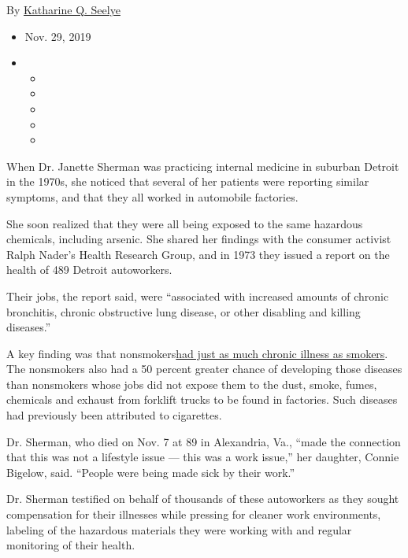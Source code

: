 By
\href{https://www.nytimes3xbfgragh.onion/by/katharine-q-seelye}{Katharine
Q. Seelye}

\begin{itemize}
\item
  Nov. 29, 2019
\item
  \begin{itemize}
  \item
  \item
  \item
  \item
  \item
  \end{itemize}
\end{itemize}

When Dr. Janette Sherman was practicing internal medicine in suburban
Detroit in the 1970s, she noticed that several of her patients were
reporting similar symptoms, and that they all worked in automobile
factories.

She soon realized that they were all being exposed to the same hazardous
chemicals, including arsenic. She shared her findings with the consumer
activist Ralph Nader's Health Research Group, and in 1973 they issued a
report on the health of 489 Detroit autoworkers.

Their jobs, the report said, were ``associated with increased amounts of
chronic bronchitis, chronic obstructive lung disease, or other disabling
and killing diseases.''

A key finding was that
nonsmokers\href{https://www.nytimes3xbfgragh.onion/1973/09/09/archives/heartlung-ills-tied-to-job-perils-study-challenges-ideas-on-the.html?searchResultPosition=2}{had
just as much chronic illness as smokers}. The nonsmokers also had a 50
percent greater chance of developing those diseases than nonsmokers
whose jobs did not expose them to the dust, smoke, fumes, chemicals and
exhaust from forklift trucks to be found in factories. Such diseases had
previously been attributed to cigarettes.

Dr. Sherman, who died on Nov. 7 at 89 in Alexandria, Va., ``made the
connection that this was not a lifestyle issue --- this was a work
issue,'' her daughter, Connie Bigelow, said. ``People were being made
sick by their work.''

Dr. Sherman testified on behalf of thousands of these autoworkers as
they sought compensation for their illnesses while pressing for cleaner
work environments, labeling of the hazardous materials they were working
with and regular monitoring of their health.

